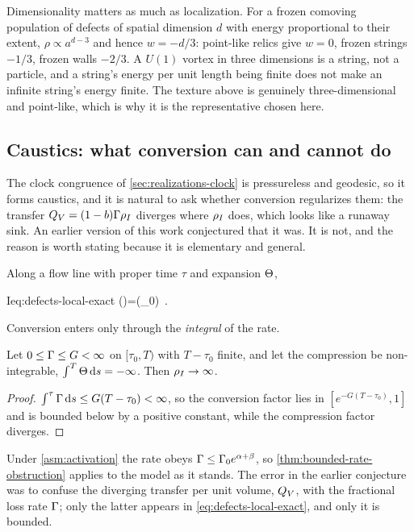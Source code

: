 Dimensionality matters as much as localization. For a frozen comoving
population of defects of spatial dimension $d$ with energy proportional to
their extent, $\rho\propto a^{d-3}$ and hence $w=-d/3$: point-like relics give
$w=0$, frozen strings $-1/3$, frozen walls $-2/3$. A $U(1)$ vortex in three
dimensions is a string, not a particle, and a string's energy per unit length
being finite does not make an infinite string's energy finite. The texture
above is genuinely three-dimensional and point-like, which is why it is the
representative chosen here.

\subsection{Caustics: what conversion can and cannot do}
\label{sec:defects-caustics}

The clock congruence of \cref{sec:realizations-clock} is pressureless and
geodesic, so it forms caustics, and it is natural to ask whether conversion
regularizes them: the transfer $Q_{V}=(1-b)\Gamma\rho_{I}$ diverges where $\rho_{I}$
does, which looks like a runaway sink. An earlier version of this work
conjectured that it was. It is not, and the reason is worth stating because it
is elementary and general.

Along a flow line with proper time $\tau$ and expansion $\Theta$,
%
\begin{keyresult}{I}{eq:defects-local-exact}
  \rhoI(\tau)=\rhoI(\tau_0)\,
  \exp{} .
\end{keyresult}
%
Conversion enters only through the \emph{integral} of the rate.

\begin{theorem}
  \label{thm:bounded-rate-obstruction}
  Let $0\le\Gamma\le G<\infty$ on $[\tau_0,T)$ with $T-\tau_0$ finite, and let
  the compression be non-integrable, $\int^{T}\Theta\,\mathrm{d} s=-\infty$. Then
  $\rho_{I}\to\infty$.
\end{theorem}

\begin{proof}
  $\int^{\tau}\Gamma\,\mathrm{d} s\le G(T-\tau_0)<\infty$, so the conversion factor lies
  in $[e^{-G(T-\tau_0)},1]$ and is bounded below by a positive constant, while
  the compression factor diverges.
\end{proof}

Under \cref{asm:activation} the rate obeys $\Gamma\le\Gamma_{0} e^{\alpha+\beta}$, so
\cref{thm:bounded-rate-obstruction} applies to the model as it stands. The
error in the earlier conjecture was to confuse the diverging transfer per unit
volume, $Q_{V}$, with the fractional loss rate $\Gamma$; only the latter appears in
\cref{eq:defects-local-exact}, and only it is bounded.

